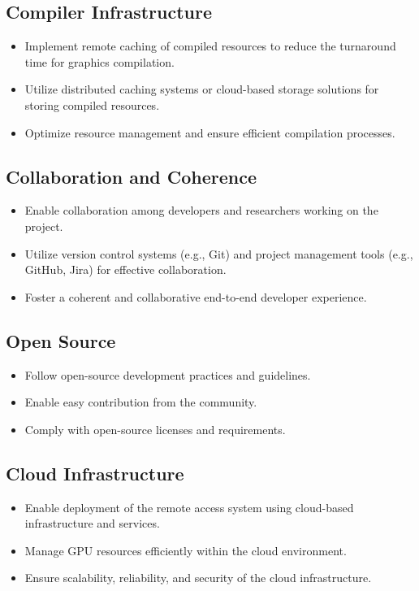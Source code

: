 \subsection{Compiler Infrastructure}

\begin{itemize}
    \item Implement remote caching of compiled resources to reduce the turnaround time for graphics compilation.
    \item Utilize distributed caching systems or cloud-based storage solutions for storing compiled resources.
    \item Optimize resource management and ensure efficient compilation processes.
\end{itemize}


\subsection{Collaboration and Coherence}

\begin{itemize}
    \item Enable collaboration among developers and researchers working on the project.
    \item Utilize version control systems (e.g., Git) and project management tools (e.g., GitHub, Jira) for effective collaboration.
    \item Foster a coherent and collaborative end-to-end developer experience.
\end{itemize}


\subsection{Open Source}

\begin{itemize}
    \item Follow open-source development practices and guidelines.
    \item Enable easy contribution from the community.
    \item Comply with open-source licenses and requirements.
\end{itemize}


\subsection{Cloud Infrastructure}

\begin{itemize}
    \item Enable deployment of the remote access system using cloud-based infrastructure and services.
    \item Manage GPU resources efficiently within the cloud environment.
    \item Ensure scalability, reliability, and security of the cloud infrastructure.
\end{itemize}


